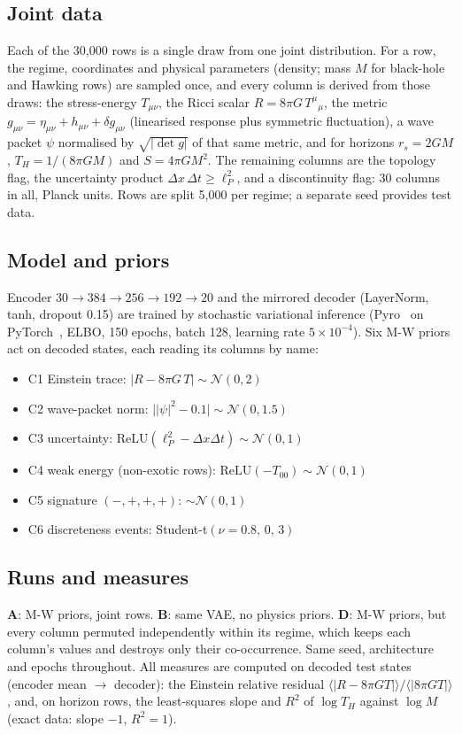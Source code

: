 \documentclass[10pt,twocolumn]{article}
\begin{document}
\subsection{Joint data}
Each of the 30{,}000 rows is a single draw from one joint distribution. For a row, the regime,
coordinates and physical parameters (density; mass $M$ for black-hole and Hawking rows) are
sampled once, and every column is derived from those draws: the stress-energy $T_{\mu\nu}$, the
Ricci scalar $R=8\pi G\,T^{\mu}{}_{\mu}$, the metric $g_{\mu\nu}=\eta_{\mu\nu}+h_{\mu\nu}+\delta
g_{\mu\nu}$ (linearised response plus symmetric fluctuation), a wave packet $\psi$ normalised by
$\sqrt{|\det g|}$ of that same metric, and for horizons $r_s=2GM$, $T_H=1/(8\pi GM)$ and
$S=4\pi GM^2$. The remaining columns are the topology flag, the uncertainty product
$\Delta x\,\Delta t\ge \ell_P^2$, and a discontinuity flag: 30 columns in all, Planck units.
Rows are split 5{,}000 per regime; a separate seed provides test data.

\subsection{Model and priors}
Encoder $30\!\to\!384\!\to\!256\!\to\!192\!\to\!20$ and the mirrored decoder (LayerNorm, tanh,
dropout 0.15) are trained by stochastic variational inference (Pyro~\cite{pyro} on PyTorch~\cite{pytorch}, ELBO, 150 epochs, batch
128, learning rate $5\times10^{-4}$). Six M-W priors act on decoded states, each reading its
columns by name:
\begin{itemize}\setlength\itemsep{1pt}
\item C1 Einstein trace: $|R-8\pi G\,T|\sim\mathcal N(0,2)$
\item C2 wave-packet norm: $\big||\psi|^2-0.1\big|\sim\mathcal N(0,1.5)$
\item C3 uncertainty: $\mathrm{ReLU}(\ell_P^2-\Delta x\Delta t)\sim\mathcal N(0,1)$
\item C4 weak energy (non-exotic rows): $\mathrm{ReLU}(-T_{00})\sim\mathcal N(0,1)$
\item C5 signature $(-,+,+,+)$: $\sim\mathcal N(0,1)$
\item C6 discreteness events: Student-t$(\nu{=}0.8,\,0,\,3)$
\end{itemize}

\subsection{Runs and measures}
\textbf{A}: M-W priors, joint rows. \textbf{B}: same VAE, no physics priors. \textbf{D}: M-W priors,
but every column permuted independently within its regime, which keeps each column's values and
destroys only their co-occurrence. Same seed, architecture and epochs throughout. All measures
are computed on decoded test states (encoder mean $\to$ decoder): the Einstein relative residual
$\langle|R-8\pi G T|\rangle/\langle|8\pi G T|\rangle$, and, on horizon rows, the least-squares
slope and $R^2$ of $\log T_H$ against $\log M$ (exact data: slope $-1$, $R^2=1$).
\end{document}
